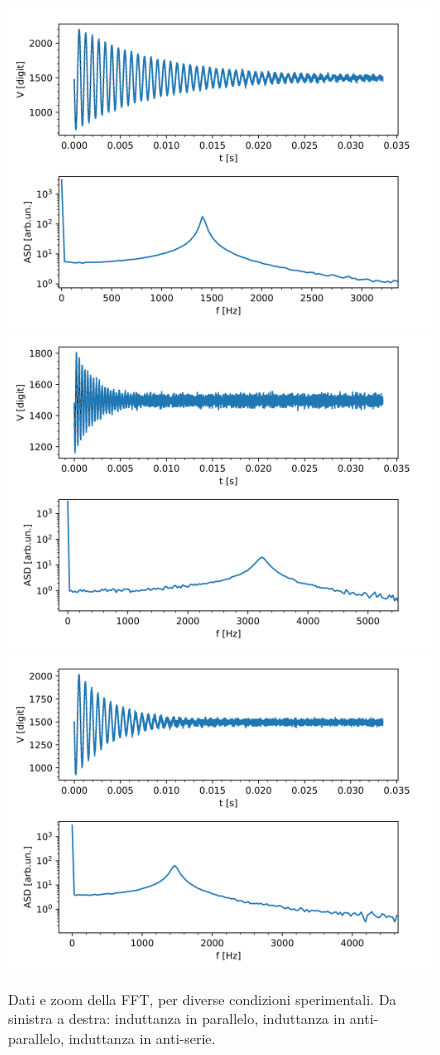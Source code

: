 \documentclass{article}[a4paper, oneside,11pt]
\begin{document}
\begin{figure}[H]
    \centering
    \includegraphics[width=0.45\columnwidth]{img/ese12/ind_par.png}
    \includegraphics[width=0.45\columnwidth]{img/ese12/ind_antip.png}
    \includegraphics[width=0.50\columnwidth]{img/ese12/ind_antis.png}
    \caption{Dati e zoom della FFT, per diverse condizioni sperimentali. Da sinistra a destra: induttanza in parallelo, induttanza in anti-parallelo, induttanza in anti-serie.}
    \label{fig:ese12 - Induttanze in parallelo, antiparallelo e antiserie}
\end{figure}
\end{document}
